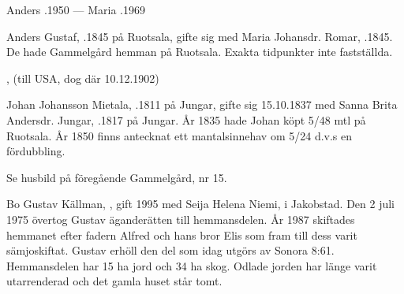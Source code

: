 Anders .1950  ---  Maria .1969


%
Anders Gustaf, .1845 på Ruotsala, gifte sig med Maria Johansdr. Romar, .1845. De hade Gammelgård hemman på Ruotsala. Exakta tidpunkter inte fastställda.
\begin{jhchildren}
  \item {}, (till USA, dog där 10.12.1902)
  \item {}
\end{jhchildren}


%
Johan Johansson Mietala, .1811 på Jungar, gifte sig 15.10.1837 med Sanna Brita Andersdr. Jungar, .1817 på Jungar. År 1835 hade Johan köpt 5/48 mtl på Ruotsala. År 1850 finns antecknat ett mantalsinnehav om 5/24 d.v.s en fördubbling.
\begin{jhchildren}
  \item {}
  \item {}
  \item {}
  \item {}
  \item {}
  \item {}
  \item {}
  \item {}
\end{jhchildren}



%

Se husbild på föregående Gammelgård, nr 15.

%
Bo Gustav Källman, , gift 1995 med Seija Helena Niemi,  i Jakobstad. Den 2 juli 1975 övertog Gustav äganderätten till hemmansdelen. År 1987 skiftades hemmanet efter fadern Alfred och hans bror Elis som fram till dess varit sämjoskiftat. Gustav erhöll den del som idag utgörs av Sonora 8:61. Hemmansdelen har 15 ha jord och 34 ha skog. Odlade jorden har länge varit utarrenderad och det gamla huset står tomt.

